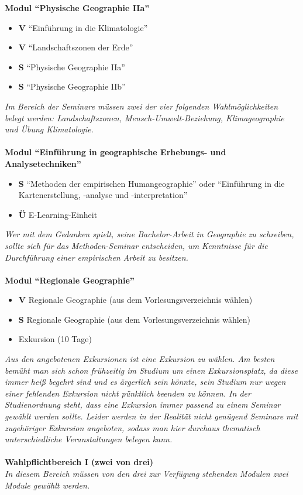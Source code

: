 \textbf{Modul "`Physische Geographie IIa"'}
	\begin{itemize}
		\item \textbf{V} "`Einführung in die Klimatologie"'
		\item \textbf{V} "`Landschaftszonen der Erde"'
		\item \textbf{S} "`Physische Geographie IIa"'
		\item \textbf{S} "`Physische Geographie IIb"'
	\end{itemize}	
	
\emph{Im Bereich der Seminare müssen zwei der vier folgenden Wahlmöglichkeiten belegt werden: Landschaftszonen, Mensch-Umwelt-Beziehung, Klimageographie und Übung Klimatologie.}\\\\
\textbf{Modul "`Einführung in geographische Erhebungs- und Analysetechniken"'}
	\begin{itemize}
		\item \textbf{S} "`Methoden der empirischen Humangeographie"' oder "`Einführung in die Kartenerstellung, -analyse und -interpretation"'
		\item \textbf{Ü} E-Learning-Einheit
	\end{itemize}
\emph{Wer mit dem Gedanken spielt, seine Bachelor-Arbeit in Geographie zu schreiben, sollte sich für das Methoden-Seminar entscheiden, um Kenntnisse für die Durchführung einer empirischen Arbeit zu besitzen.}\\\\
\textbf{Modul "`Regionale Geographie"'}
	\begin{itemize}
		\item \textbf{V} Regionale Geographie (aus dem Vorlesungsverzeichnis wählen)
		\item \textbf{S} Regionale Geographie (aus dem Vorlesungsverzeichnis wählen)
		\item Exkursion (10 Tage)
	\end{itemize}
\emph{Aus den angebotenen Exkursionen ist eine Exkursion zu wählen. Am besten bemüht man sich schon frühzeitig im Studium um einen Exkursionsplatz, da diese immer heiß begehrt sind und es ärgerlich sein könnte, sein Studium nur wegen einer fehlenden Exkursion nicht pünktlich beenden zu können. In der Studienordnung steht, dass eine Exkursion immer passend zu einem Seminar gewählt werden sollte. Leider werden in der Realität nicht genügend Seminare mit zugehöriger Exkursion angeboten, sodass man hier durchaus thematisch unterschiedliche Veranstaltungen belegen kann.}
\\\\
\textbf{Wahlpflichtbereich I (zwei von drei)}\\
\emph{In diesem Bereich müssen von den drei zur Verfügung stehenden Modulen zwei Module gewählt werden.}\\

